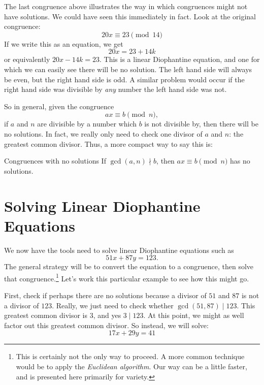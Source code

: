 \documentclass[12pt]{article}
\begin{document}
The last congruence above illustrates the way in which congruences might not have solutions.  We could have seen this immediately in fact.  Look at the original congruence:
\[20x \equiv 23 \pmod{14}\]
If we write this as an equation, we get 
\[20x = 23 + 14k\]
or equivalently $20x - 14k = 23$.  This is a linear Diophantine equation, and one for which we can easily see there will be no solution.  The left hand side will always be even, but the right hand side is odd.  A similar problem would occur if the right hand side was divisible by {\em any} number the left hand side was not.  

So in general, given the congruence
\[ax \equiv b \pmod{n},\]
if $a$ and $n$ are divisible by a number which $b$ is not divisible by, then there will be no solutions.  In fact, we really only need to check one divisor of $a$ and $n$: the greatest common divisor.  Thus, a more compact way to say this is:

\begin{defbox}{Congruences with no solutions}
 If $\gcd(a,n) \nmid b$, then $ax \equiv b \pmod{n}$ has no solutions.
\end{defbox}


\section{Solving Linear Diophantine Equations}

We now have the tools need to solve linear Diophantine equations such as 
\[51x + 87y = 123.\]
The general strategy will be to convert the equation to a congruence, then solve that congruence.\footnote{This is certainly not the only way to proceed.  A more common technique would be to apply the {\em Euclidean algorithm}.  Our way can be a little faster, and is presented here primarily for variety.} Let's work this particular example to see how this might go.

First, check if perhaps there are no solutions because a divisor of $51$ and $87$ is not a divisor of $123$.  Really, we just need to check whether $\gcd(51, 87) \mid 123$.  This greatest common divisor is 3, and yes $3 \mid 123$.  At this point, we might as well factor out this greatest common divisor.  So instead, we will solve:
\[17x + 29y = 41\]
\end{document}
